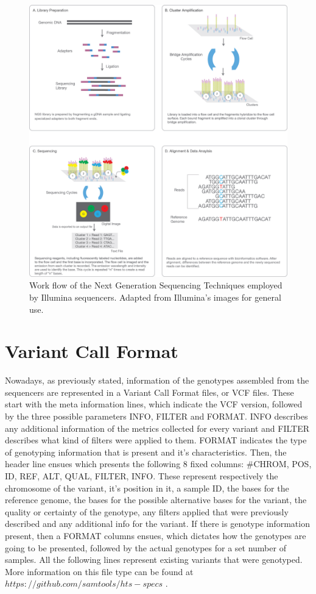 \begin{figure}
	\centering
	\includegraphics[width=\textwidth]{../images/data_prep/ngs-sequencing-workflow.jpg}
	\caption{Work flow of the Next Generation Sequencing Techniques employed by Illumina sequencers. Adapted from Illumina's images for general use.} 
	\label{ngs-sequencing}
\end{figure}

\newpage

\section{Variant Call Format}

Nowadays, as previously stated, information of the genotypes assembled from the sequencers are represented in a Variant Call Format files, or \gls{VCF} files. These start with the meta information lines, which indicate the \gls{VCF} version, followed by the three possible parameters INFO, FILTER and FORMAT. INFO describes any additional information of the metrics collected for every variant and FILTER describes what kind of filters were applied to them. FORMAT indicates the type of genotyping information that is present and it's characteristics. Then, the header line ensues which presents the following 8 fixed columns: \#CHROM, POS, ID, REF, ALT, QUAL, FILTER, INFO. These represent respectively the chromosome of the variant, it's position in it, a sample ID, the bases for the reference genome, the bases for the possible alternative bases for the variant, the quality or certainty of the genotype, any filters applied that were previously described and any additional info for the variant. If there is genotype information present, then a FORMAT columns ensues, which dictates how the genotypes are going to be presented, followed by the actual genotypes for a set number of samples. All the following lines represent existing variants that were genotyped. More information on this file type can be found at $https://github.com/samtools/hts-specs$ .

